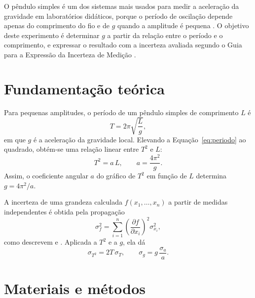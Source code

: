 \documentclass[12pt,a4paper]{report}
\newif\ifinstrucoes
\newcommand{\instrucao}[1]{\ifinstrucoes{\color{gray}\small\itshape #1\par}\fi}
\begin{document}
O pêndulo simples é um dos sistemas mais usados para medir a aceleração da gravidade em laboratórios didáticos, porque o período de oscilação depende apenas do comprimento do fio e de $g$ quando a amplitude é pequena \cite{halliday2016}. O objetivo deste experimento é determinar $g$ a partir da relação entre o período e o comprimento, e expressar o resultado com a incerteza avaliada segundo o Guia para a Expressão da Incerteza de Medição \cite{jcgm2008}.

\section{Fundamentação teórica}
\instrucao{Apresente só as equações que serão usadas, numeradas, com cada símbolo definido logo abaixo. Cite a fonte de cada resultado.}

Para pequenas amplitudes, o período de um pêndulo simples de comprimento $L$ é
\begin{equation}
  T = 2\pi\sqrt{\frac{L}{g}},
  \label{eq:periodo}
\end{equation}
em que $g$ é a aceleração da gravidade local. Elevando a Equação~\eqref{eq:periodo} ao quadrado, obtém-se uma relação linear entre $T^2$ e $L$:
\begin{equation}
  T^2 = a\,L, \qquad a = \frac{4\pi^2}{g}.
  \label{eq:linear}
\end{equation}
Assim, o coeficiente angular $a$ do gráfico de $T^2$ em função de $L$ determina $g = 4\pi^2/a$.

A incerteza de uma grandeza calculada $f(x_1, \dots, x_n)$ a partir de medidas independentes é obtida pela propagação
\begin{equation}
  \sigma_f^2 = \sum_{i=1}^{n} \left(\frac{\partial f}{\partial x_i}\right)^{\!2} \sigma_{x_i}^2,
  \label{eq:propagacao}
\end{equation}
como descrevem  e . Aplicada a $T^2$ e a $g$, ela dá
\begin{equation}
  \sigma_{T^2} = 2T\,\sigma_T, \qquad \sigma_g = g\,\frac{\sigma_a}{a}.
  \label{eq:incertezas}
\end{equation}

\section{Materiais e métodos}
\instrucao{Liste os materiais com a resolução de cada instrumento. Depois descreva o procedimento no passado e na voz impessoal, com detalhe suficiente para outra pessoa repetir o experimento.}
\end{document}
